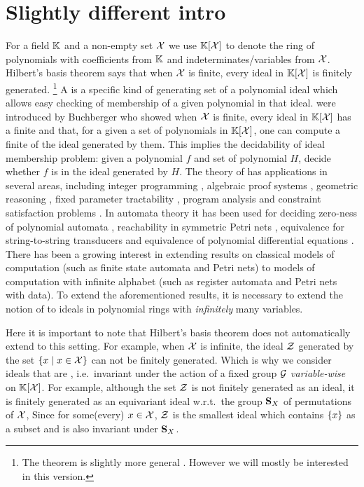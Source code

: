 \section{Slightly different intro}
%
For a field $\mathbb{K}$ and a non-empty set $\mathcal{X}$ we use $\mathbb{K}[\mathcal{X}]$ to denote the ring of polynomials with coefficients from $\mathbb{K}$ and indeterminates/variables from $\mathcal{X}$.
Hilbert's basis theorem says that when $\mathcal{X}$ is finite, every ideal in $\mathbb{K}[\mathcal{X}]$ is finitely generated.
\footnote{The theorem is slightly more general \cite[Theorem 4.1]{Lang02}. 
However we will mostly be interested in this version.}
A  is a specific kind of generating set of a polynomial ideal which allows easy checking of membership of a given polynomial in that ideal.
 were introduced by Buchberger who showed when $\mathcal{X}$ is finite,
every ideal in $\mathbb{K}[\mathcal{X}]$ has a finite  and that,
for a given a set of polynomials in $\mathbb{K}[\mathcal{X}]$,
one can compute a finite  of the ideal generated by them.
This implies the decidability of ideal membership problem:
given a polynomial $f$ and set of polynomial $H$, decide whether $f$ is in the ideal generated by $H$.
The theory of  has applications in several areas,
including
integer programming \cite{Sturmfels96},
algebraic proof systems \cite{algProof},
geometric reasoning \cite{Cox2015chGeom},
fixed parameter tractability \cite{ACDM22},
program analysis \cite{SSM04}
and constraint satisfaction problems \cite{Mas21}.
In automata theory it has been used for deciding zero-ness of polynomial automata \cite{BEDUSHWO17},
reachability in symmetric Petri nets \cite{MAME82},
equivalence for string-to-string transducers \cite{HONKALA00}
and equivalence of polynomial differential equations \cite{CLEMENTE24}.
There has been a growing interest in extending results on classical models of computation (such as finite state automata and Petri nets) to models of computation with infinite alphabet (such as register automata and Petri nets with data).
To extend the aforementioned results,
it is necessary to extend the notion of  to ideals in polynomial rings with \emph{infinitely} many variables.

Here it is important to note that Hilbert's basis theorem does not automatically extend to this setting.
For example, when $\mathcal{X}$ is infinite,
the ideal $\mathcal{Z}$ generated by the set $\{ x \mid x\in\mathcal{X} \}$ can not be finitely generated.
Which is why we consider ideals that are ,
i.e.\ invariant under the action of a fixed group $\mathcal{G}$ \emph{variable-wise} on $\mathbb{K}[\mathcal{X}]$.
For example, although the set $\mathcal{Z}$ is not finitely generated as an ideal,
it is finitely generated as an equivariant ideal w.r.t.\ the group $\mathbf{S}_{X}$ of permutations of $\mathcal{X}$,
Since for some(every) $x\in\mathcal{X}$,
$\mathcal{Z}$ is the smallest ideal which contains $\{ x \}$ as a subset and is also invariant under $\mathbf{S}_{X}$.

